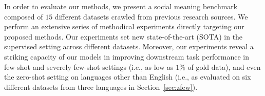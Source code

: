 % 

In order to evaluate our methods, we present a social meaning benchmark composed of $15$ different datasets crawled from previous research sources. We perform an extensive series of methodical experiments directly targeting our proposed methods. Our experiments set new state-of-the-art (SOTA) in the supervised setting across different datasets. Moreover, our experiments reveal a striking capacity of our models in improving downstream task performance in few-shot and severely few-shot settings (i.e., as low as $1\%$ of gold data), and even the zero-shot setting on languages other than English (i.e., as evaluated on six different datasets from three languages in Section~\ref{sec:zfew}). %




